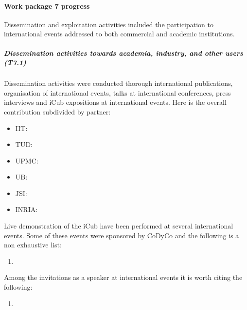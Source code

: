 

\paragraph{Work package 7 progress}

Dissemination and exploitation activities included the participation to international events addressed to both commercial and academic institutions. 

\subparagraph*{Dissemination activities towards academia, industry, and other users (T7.1)}

Dissemination activities were conducted thorough international publications, organisation of international events, talks at international conferences, press interviews and iCub expositions at international events. Here is the overall contribution subdivided by partner:

\begin{itemize}

\item IIT: 

\item TUD: 

\item UPMC: 

\item UB: 

\item JSI: 

\item INRIA: 

\end{itemize}

Live demonstration of the iCub have been performed at several international events.  Some of these events were sponsored by CoDyCo and the following is a non exhaustive list:

\begin{enumerate}

\item 

\end{enumerate} 

Among the invitations as a speaker at international events it is worth citing the following:

\begin{enumerate}

\item 

\end{enumerate} 

